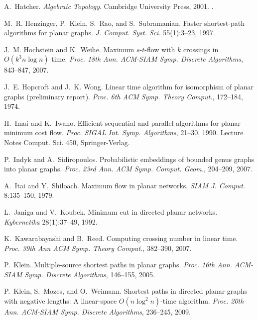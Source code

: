 \documentclass{sig-alternate}
\begin{document}
\begin{thebibliography}{10}
A.~Hatcher.
\newblock \emph{Algebraic Topology}.
\newblock Cambridge University Press, 2001.
\newblock {}.

M.~R. Henzinger, P.~Klein, S.~Rao, and S.~Subramanian.
\newblock Faster shortest-path algorithms for planar graphs.
\newblock \emph{J. Comput. Syst. Sci.} 55(1):3--23, 1997.

J.~M. Hochstein and K.~Weihe.
\newblock Maximum $s$-$t$-flow with $k$ crossings in {$O(k^3n\log n)$} time.
\newblock \emph{Proc. 18th Ann. ACM-SIAM Symp. Discrete Algorithms}, 843--847,
  2007.

J.~E. Hopcroft and J.~K. Wong.
\newblock Linear time algorithm for isomorphism of planar graphs (preliminary
  report).
\newblock \emph{Proc. 6th ACM Symp. Theory Comput.}, 172--184, 1974.

H.~Imai and K.~Iwano.
\newblock Efficient sequential and parallel algorithms for planar minimum cost
  flow.
\newblock \emph{Proc. SIGAL Int. Symp. Algorithms}, 21--30, 1990. Lecture Notes
  Comput. Sci. 450, Springer-Verlag.

P.~Indyk and A.~Sidiropoulos.
\newblock Probabilistic embeddings of bounded genus graphs into planar graphs.
\newblock \emph{Proc. 23rd Ann. ACM Symp. Comput. Geom.}, 204--209, 2007.

A.~Itai and Y.~Shiloach.
\newblock Maximum flow in planar networks.
\newblock \emph{SIAM J. Comput.} 8:135--150, 1979.

L.~Janiga and V.~Koubek.
\newblock Minimum cut in directed planar networks.
\newblock \emph{Kybernetika} 28(1):37--49, 1992.

K.~Kawarabayashi and B.~Reed.
\newblock Computing crossing number in linear time.
\newblock \emph{Proc. 39th Ann ACM Symp. Theory Comput.}, 382--390, 2007.

P.~Klein.
\newblock Multiple-source shortest paths in planar graphs.
\newblock \emph{Proc. 16th Ann. ACM-SIAM Symp. Discrete Algorithms}, 146--155,
  2005.

P.~Klein, S.~Mozes, and O.~Weimann.
\newblock Shortest paths in directed planar graphs with negative lengths: {A}
  linear-space {$O(n\log^2 n)$}-time algorithm.
\newblock \emph{Proc. 20th Ann. ACM-SIAM Symp. Discrete Algorithms}, 236--245,
  2009.


\end{thebibliography}
\end{document}
